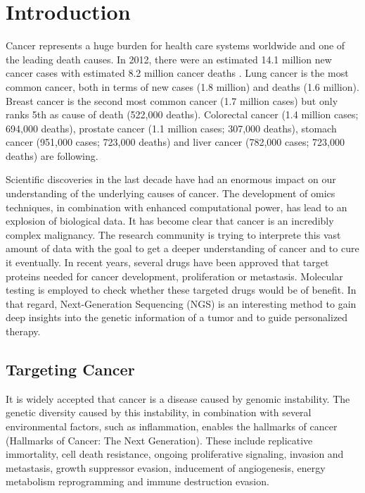 \section{Introduction}

  Cancer represents a huge burden for health care systems worldwide and one of
  the leading death causes. In 2012, there were an estimated 14.1 million new
  cancer cases with estimated  8.2 million cancer deaths
  {\cite{cancer_stats_worldwide:2012}}. Lung cancer is the most common cancer,
  both in terms of new cases (1.8 million) and deaths (1.6 million). Breast
  cancer is the second most common cancer (1.7 million cases) but only ranks 5th
  as cause of death (522,000 deaths). Colorectal cancer (1.4 million cases;
  694,000 deaths), prostate cancer (1.1 million cases; 307,000 deaths), stomach
  cancer (951,000 cases; 723,000 deaths) and liver cancer (782,000 cases;
  723,000 deaths) are following.

  Scientific discoveries in the last decade have had an enormous impact on our
  understanding of the underlying causes of cancer. The development of omics
  techniques, in combination with enhanced computational power, has lead to an
  explosion of biological data. It has become clear that cancer is an incredibly
  complex malignancy. The research community is trying to interprete this vast
  amount of data with the goal to get a deeper understanding of cancer and to
  cure it eventually. In recent years, several drugs have been approved that
  target proteins needed for cancer development, proliferation or metastasis.
  Molecular testing is employed to check whether these targeted drugs would be
  of benefit. In that regard, Next-Generation Sequencing (NGS) is an interesting
  method to gain deep insights into the genetic information of a tumor and to
  guide personalized therapy.

  \subsection{Targeting Cancer}

    It is widely accepted that cancer is a disease caused by genomic instability.
    The genetic diversity caused by this instability, in combination with several
    environmental factors, such as inflammation, enables the hallmarks of cancer
    (Hallmarks of Cancer: The Next Generation). These include replicative
    immortality, cell death resistance, ongoing proliferative signaling,
    invasion and metastasis, growth suppressor evasion, inducement of
    angiogenesis, energy metabolism reprogramming and immune destruction evasion.

